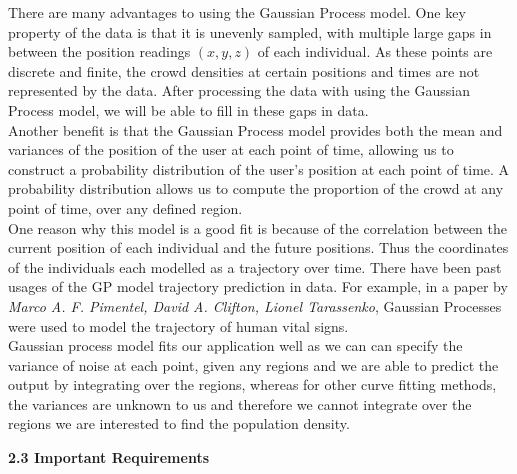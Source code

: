 \documentclass[letterpaper]{article}
\begin{document}
There are many advantages to using the Gaussian Process model. One key property of the data is that it is unevenly sampled, with multiple large gaps in between the position readings $(x,y,z)$ of each individual. As these points are discrete and finite, the crowd densities at certain positions and times are not represented by the data. After processing the data with using the Gaussian Process model, we will be able to fill in these gaps in data. \\

Another benefit is that the Gaussian Process model provides both the mean and variances of the position of the user at each point of time, allowing us to construct a probability distribution of the user's position at each point of time. A probability distribution allows us to compute the proportion of the crowd at any point of time, over any defined region. \\

One reason why this model is a good fit is because of the correlation between the current position of each individual and the future positions. Thus the coordinates of the individuals each modelled as a trajectory over time. There have been past usages of the GP model trajectory prediction in data. For example, in a paper by {\it Marco A. F. Pimentel, David A. Clifton, Lionel Tarassenko}, Gaussian Processes were used to model the trajectory of human vital signs. \\


Gaussian process model fits our application well as we can can specify the variance of noise at each point, given any regions and we are able to predict the output by integrating over the regions, whereas for other curve fitting methods, the variances are unknown to us and therefore we cannot integrate over the regions we are interested to find the population density.


{\bf2.3  Important Requirements} \\
\end{document}
